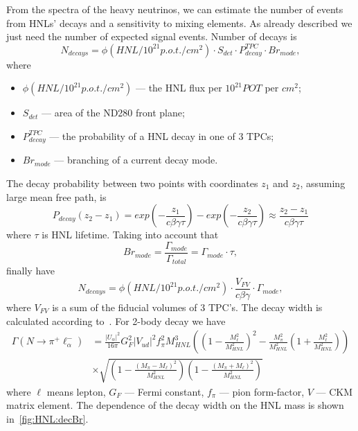 \documentclass[../main.tex]{subfiles}
\begin{document}
From the spectra of the heavy neutrinos, we can estimate the number of events from HNLs' decays and a sensitivity to mixing elements. As already described we just need the number of expected signal events. Number of decays is
\begin{equation}
    N_{decays}=\phi(HNL/10^{21}p.o.t./cm^2)\cdot S_{det} \cdot P_{decay}^{TPC}\cdot Br_{mode},
    \label{eq:HNL:Nevents}
\end{equation}
where
\begin{itemize}
    \item $\phi(HNL/10^{21}p.o.t./cm^2)$ --- the HNL flux per $10^{21}POT$ per $cm^2$;
    \item $S_{det}$ --- area of the ND280 front plane;
    \item $P_{decay}^{TPC}$ --- the probability of a HNL decay in one of 3 TPCs;
    \item $Br_{mode}$ --- branching of a current decay mode.
\end{itemize}
The decay probability between two points with coordinates $z_1$ and $z_2$, assuming large mean free path, is
\begin{equation}
    P_{decay}(z_2-z_1)=exp(-\frac{z_1}{c\beta\gamma\tau})-exp(-\frac{z_2}{c\beta\gamma\tau})\approx \frac{z_2-z_1}{c\beta\gamma\tau}
    \label{eq:HNL:Pdecay}
\end{equation}
where $\tau$ is HNL lifetime. Taking into account that
\begin{equation}
    Br_{mode}=\frac{\Gamma_{mode}}{\Gamma_{total}}=\Gamma_{mode}\cdot\tau,
\end{equation}
finally have
\begin{equation}
    N_{decays}=\phi(HNL/10^{21}p.o.t./cm^2)\cdot\frac{V_{FV}}{c\beta\gamma}\cdot\Gamma_{mode},
    \label{eq:HNL:EventsN}
\end{equation}
where $V_{FV}$ is a sum of the fiducial volumes of 3 TPC's. The decay width is calculated according to~\cite{Johnson1997, Gorbunov2007}. For 2-body decay we have
\begin{equation}
    \begin{split}
    \Gamma\left(N\to \pi^+\ell_\alpha^-\right)&=\frac{\left|U_\alpha\right|^2}{16\pi}G_F^2\left|V_{ud}\right|^2f_\pi^2M_{HNL}^3\left(\left(1-\frac{M_\ell^2}{M_{HNL}^2}\right)^2-\frac{M_{\pi}^2}{M_{HNL}^2}\left(1+\frac{M_\ell^2}{M_{HNL}^2}\right)\right)     \\
    &\times \sqrt{\left(1-\frac{\left(M_{\pi}-M_\ell\right)^2}{M_{HNL}^2}\right)\left(1-\frac{\left(M_{\pi}+M_\ell\right)^2}{M_{HNL}^2}\right)}
    \end{split}
\end{equation}
where  $\ell$ means lepton, $G_F$ --- Fermi constant, $f_\pi$ --- pion form-factor, $V$ --- CKM matrix element. The dependence of the decay width on the HNL mass is shown in~\autoref{fig:HNL:decBr}.
\end{document}
